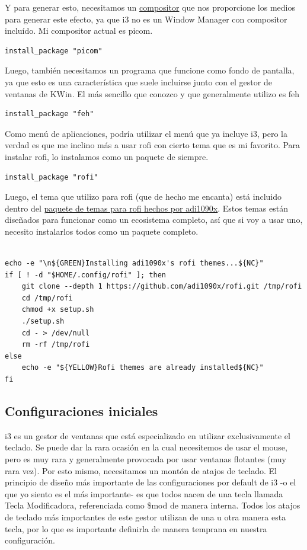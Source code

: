 \documentclass[11pt]{article}
\begin{document}
Y para generar esto, necesitamos un \href{https://en.wikipedia.org/wiki/Compositing\_manager}{compositor} que nos proporcione los medios para generar este efecto, ya que i3 no es un Window Manager con compositor incluído. Mi compositor actual es picom.

\begin{verbatim}
install_package "picom"
\end{verbatim}

Luego, también necesitamos un programa que funcione como fondo de pantalla, ya que esto es una característica que suele incluirse junto con el gestor de ventanas de KWin. El más sencillo que conozco y que generalmente utilizo es feh

\begin{verbatim}
install_package "feh"
\end{verbatim}

Como menú de aplicaciones, podría utilizar el menú que ya incluye i3, pero la verdad es que me inclino más a usar rofi con cierto tema que es mi favorito. Para instalar rofi, lo instalamos como un paquete de siempre.

\begin{verbatim}
install_package "rofi"
\end{verbatim}

Luego, el tema que utilizo para rofi (que de hecho me encanta) está incluido dentro del \href{https://github.com/adi1090x/rofi}{paquete de temas para rofi hechos por adi1090x}. Estos temas están diseñados para funcionar como un ecosistema completo, así que si voy a usar uno, necesito instalarlos todos como un paquete completo.

\begin{verbatim}

echo -e "\n${GREEN}Installing adi1090x's rofi themes...${NC}"
if [ ! -d "$HOME/.config/rofi" ]; then
    git clone --depth 1 https://github.com/adi1090x/rofi.git /tmp/rofi
    cd /tmp/rofi
    chmod +x setup.sh
    ./setup.sh
    cd - > /dev/null
    rm -rf /tmp/rofi
else
    echo -e "${YELLOW}Rofi themes are already installed${NC}"
fi

\end{verbatim}
\subsection{Configuraciones iniciales}
\label{sec:orgdd06f6d}

i3 es un gestor de ventanas que está especializado en utilizar exclusivamente el teclado. Se puede dar la rara ocasión en la cual necesitemos de usar el mouse, pero es muy rara y generalmente provocada por usar ventanas flotantes (muy rara vez). Por esto mismo, necesitamos un montón de atajos de teclado. El principio de diseño más importante de las configuraciones por default de i3 -o el que yo siento es el más importante- es que todos nacen de una tecla llamada Tecla Modificadora, referenciada como \$mod de manera interna. Todos los atajos de teclado más importantes de este gestor utilizan de una u otra manera esta tecla, por lo que es importante definirla de manera temprana en nuestra configuración.
\end{document}
